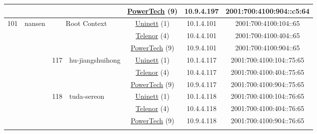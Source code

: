 \begin{small}
\begin{center}
\begin{longtable}{|c|c|c|c|c|c|c|c|}
  &  &  &  & \multicolumn{2}{|c|}{\tiny{\href{http://www.powertech.no}{PowerTech} (9)}} & \tiny{10.9.4.197} & \tiny{2001:700:4100:904::c5:64} \\ \hline
 \multirow{39}{*}{\tiny{101}} & \multicolumn{1}{|l|}{\multirow{39}{*}{\tiny{nansen}}} & \multicolumn{2}{|c|}{\multirow{3}{*}{\tiny{Root Context}}} & \multicolumn{2}{|c|}{\tiny{\href{https://www.uninett.no}{Uninett} (1)}} & \tiny{10.1.4.101} & \tiny{2001:700:4100:104::65} \\* \cline{5-5}\cline{6-6}\cline{7-7}\cline{8-8}
  &  & \multicolumn{2}{|c|}{} & \multicolumn{2}{|c|}{\tiny{\href{https://www.telenor.no}{Telenor} (4)}} & \tiny{10.4.4.101} & \tiny{2001:700:4100:404::65} \\* \cline{5-5}\cline{6-6}\cline{7-7}\cline{8-8}
  &  & \multicolumn{2}{|c|}{} & \multicolumn{2}{|c|}{\tiny{\href{http://www.powertech.no}{PowerTech} (9)}} & \tiny{10.9.4.101} & \tiny{2001:700:4100:904::65} \\* \cline{3-3}\cline{4-4}\cline{5-5}\cline{6-6}\cline{7-7}\cline{8-8}
  &  & \multirow{3}{*}{\tiny{117}} & \multicolumn{1}{|l|}{\multirow{3}{*}{\tiny{hu-jiangshuihong}}} & \multicolumn{2}{|c|}{\tiny{\href{https://www.uninett.no}{Uninett} (1)}} & \tiny{10.1.4.117} & \tiny{2001:700:4100:104::75:65} \\* \cline{5-5}\cline{6-6}\cline{7-7}\cline{8-8}
  &  &  &  & \multicolumn{2}{|c|}{\tiny{\href{https://www.telenor.no}{Telenor} (4)}} & \tiny{10.4.4.117} & \tiny{2001:700:4100:404::75:65} \\* \cline{5-5}\cline{6-6}\cline{7-7}\cline{8-8}
  &  &  &  & \multicolumn{2}{|c|}{\tiny{\href{http://www.powertech.no}{PowerTech} (9)}} & \tiny{10.9.4.117} & \tiny{2001:700:4100:904::75:65} \\* \cline{3-3}\cline{4-4}\cline{5-5}\cline{6-6}\cline{7-7}\cline{8-8}
  &  & \multirow{3}{*}{\tiny{118}} & \multicolumn{1}{|l|}{\multirow{3}{*}{\tiny{tuda-sereon}}} & \multicolumn{2}{|c|}{\tiny{\href{https://www.uninett.no}{Uninett} (1)}} & \tiny{10.1.4.118} & \tiny{2001:700:4100:104::76:65} \\* \cline{5-5}\cline{6-6}\cline{7-7}\cline{8-8}
  &  &  &  & \multicolumn{2}{|c|}{\tiny{\href{https://www.telenor.no}{Telenor} (4)}} & \tiny{10.4.4.118} & \tiny{2001:700:4100:404::76:65} \\* \cline{5-5}\cline{6-6}\cline{7-7}\cline{8-8}
  &  &  &  & \multicolumn{2}{|c|}{\tiny{\href{http://www.powertech.no}{PowerTech} (9)}} & \tiny{10.9.4.118} & \tiny{2001:700:4100:904::76:65} \\* \cline{3-3}\cline{4-4}\cline{5-5}\cline{6-6}\cline{7-7}\cline{8-8}

\end{longtable}
\end{center}
\end{small}
